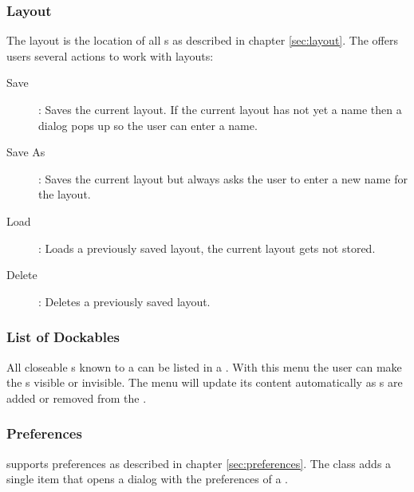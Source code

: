 

\subsubsection{Layout}
The layout is the location of all s as described in chapter \ref{sec:layout}. The  offers users several actions to work with layouts:
\begin{description}
 \item [Save]: Saves the current layout. If the current layout has not yet a name then a dialog pops up so the user can enter a name.
 \item [Save As]: Saves the current layout but always asks the user to enter a new name for the layout.
 \item [Load]: Loads a previously saved layout, the current layout gets not stored.
 \item [Delete]: Deletes a previously saved layout.
\end{description}

\subsubsection{List of Dockables}
All closeable s known to a  can be listed in a \linebreak {}. With this menu the user can make the \linebreak {}s visible or invisible. The menu will update its content automatically as s are added or removed from the .

\subsubsection{Preferences}
 supports preferences as described in chapter \ref{sec:preferences}. The class \linebreak {} adds a single item that opens a dialog with the preferences of a .


